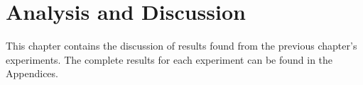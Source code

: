 \chapter{Analysis and Discussion}

This chapter contains the discussion of results found from the previous chapter's experiments. The complete results for each experiment can be found in the Appendices.




